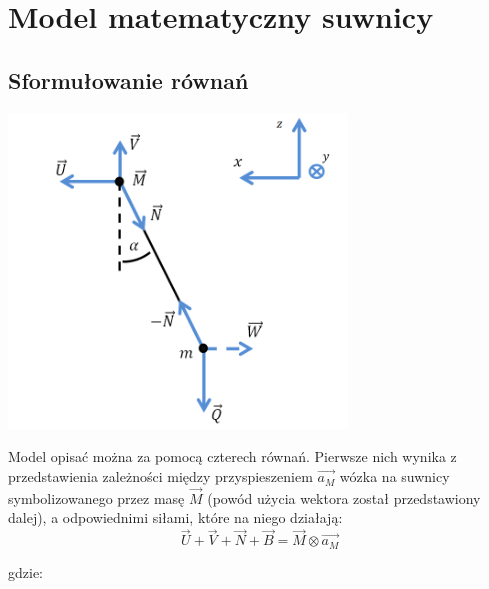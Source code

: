 \documentclass[10pt]{article}
\begin{document}
\setlength{\parindent}{0cm}


\section*{Model matematyczny suwnicy}
\subsection*{Sformułowanie równań}
\begin{center}
\includegraphics[width=9cm]{pic1}
\end{center}

Model opisać można za pomocą czterech równań. Pierwsze nich wynika z przedstawienia zależności między przyspieszeniem $\vec{a_M}$ wózka na suwnicy symbolizowanego przez masę $\vec{M}$ (powód użycia wektora został przedstawiony dalej), a odpowiednimi siłami, które na niego działają:
\begin{equation}
\vec{U} + \vec{V} + \vec{N} + \vec{B} = \vec{M} \otimes \vec{a_M}
\end{equation}

gdzie:
\end{document}

